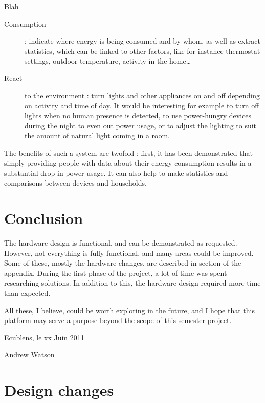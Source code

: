 Blah

\begin{description}
  \item[Consumption] : indicate where energy is being consumed and by whom, as
    well as extract statistics, which can be linked to other factors, like for
    instance thermostat settings, outdoor temperature, activity in the
    home\ldots
  \item[React] to the environment : turn lights and other appliances on and off
    depending on activity and time of day. It would be interesting for example
    to turn off lights when no human presence is detected, to use power-hungry
    devices during the night to even out power usage, or to adjust the lighting
    to suit the amount of natural light coming in a room. 
\end{description}

The benefits of such a system are twofold : first, it has been
demonstrated\cite{darby2006} that simply providing people with data about their
energy consumption results in a substantial drop in power usage. It can also
help to make statistics and comparisons between devices and households.

\section{Conclusion}


The hardware design is functional, and can be demonstrated as requested.
However, not everything is fully functional, and many areas could be improved.
Some of these, mostly the hardware changes, are described in section
 of the appendix. During the first phase of the
project, a lot of time was spent researching solutions. In addition to this, the
hardware design required more time than expected.

All these, I believe, could be worth exploring in the future, and I hope that
this platform may serve a purpose beyond the scope of this semester project.

\vspace{3cm}
Ecublens, le xx Juin 2011

\vspace{2cm}
Andrew Watson



\pagebreak



\pagebreak
\appendix

\section{Design changes}
\label{sec:design-changes}


